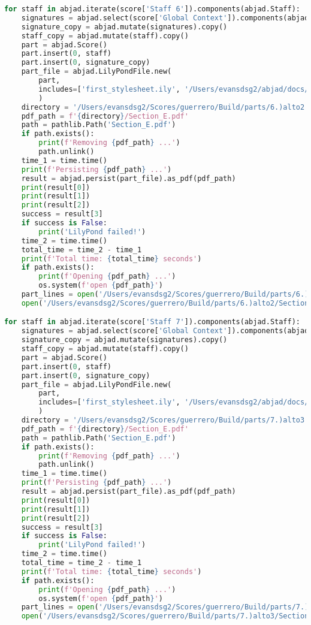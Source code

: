 \begin{lstlisting}[language=Python, caption=Invocation Source Code]
for staff in abjad.iterate(score['Staff 6']).components(abjad.Staff):
    signatures = abjad.select(score['Global Context']).components(abjad.Staff)
    signature_copy = abjad.mutate(signatures).copy()
    staff_copy = abjad.mutate(staff).copy()
    part = abjad.Score()
    part.insert(0, staff)
    part.insert(0, signature_copy)
    part_file = abjad.LilyPondFile.new(
        part,
        includes=['first_stylesheet.ily', '/Users/evansdsg2/abjad/docs/source/_stylesheets/abjad.ily'],
        )
    directory = '/Users/evansdsg2/Scores/guerrero/Build/parts/6.)alto2'
    pdf_path = f'{directory}/Section_E.pdf'
    path = pathlib.Path('Section_E.pdf')
    if path.exists():
        print(f'Removing {pdf_path} ...')
        path.unlink()
    time_1 = time.time()
    print(f'Persisting {pdf_path} ...')
    result = abjad.persist(part_file).as_pdf(pdf_path)
    print(result[0])
    print(result[1])
    print(result[2])
    success = result[3]
    if success is False:
        print('LilyPond failed!')
    time_2 = time.time()
    total_time = time_2 - time_1
    print(f'Total time: {total_time} seconds')
    if path.exists():
        print(f'Opening {pdf_path} ...')
        os.system(f'open {pdf_path}')
    part_lines = open('/Users/evansdsg2/Scores/guerrero/Build/parts/6.)alto2/Section_E.ly').readlines()
    open('/Users/evansdsg2/Scores/guerrero/Build/parts/6.)alto2/Section_E.ly', 'w').writelines(part_lines[15:-1])

for staff in abjad.iterate(score['Staff 7']).components(abjad.Staff):
    signatures = abjad.select(score['Global Context']).components(abjad.Staff)
    signature_copy = abjad.mutate(signatures).copy()
    staff_copy = abjad.mutate(staff).copy()
    part = abjad.Score()
    part.insert(0, staff)
    part.insert(0, signature_copy)
    part_file = abjad.LilyPondFile.new(
        part,
        includes=['first_stylesheet.ily', '/Users/evansdsg2/abjad/docs/source/_stylesheets/abjad.ily'],
        )
    directory = '/Users/evansdsg2/Scores/guerrero/Build/parts/7.)alto3'
    pdf_path = f'{directory}/Section_E.pdf'
    path = pathlib.Path('Section_E.pdf')
    if path.exists():
        print(f'Removing {pdf_path} ...')
        path.unlink()
    time_1 = time.time()
    print(f'Persisting {pdf_path} ...')
    result = abjad.persist(part_file).as_pdf(pdf_path)
    print(result[0])
    print(result[1])
    print(result[2])
    success = result[3]
    if success is False:
        print('LilyPond failed!')
    time_2 = time.time()
    total_time = time_2 - time_1
    print(f'Total time: {total_time} seconds')
    if path.exists():
        print(f'Opening {pdf_path} ...')
        os.system(f'open {pdf_path}')
    part_lines = open('/Users/evansdsg2/Scores/guerrero/Build/parts/7.)alto3/Section_E.ly').readlines()
    open('/Users/evansdsg2/Scores/guerrero/Build/parts/7.)alto3/Section_E.ly', 'w').writelines(part_lines[15:-1])


\end{lstlisting}
